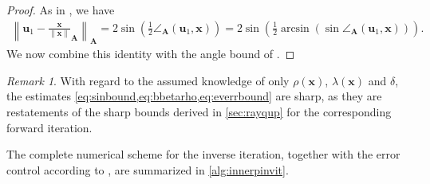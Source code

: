 \documentclass[a4paper,11pt,oneside]{amsart}
\theoremstyle{definition}
\theoremstyle{remark}
\newtheorem{remark}[theorem]{Remark}
\newcommand{\A}{\ten A}
\newcommand{\ten}[1]{\boldsymbol{#1}}
\numberwithin{equation}{section}
\numberwithin{theorem}{section}
\begin{document}
\begin{proof}
%
%
As in , we have
%
%
%
%
%
%
%
%
%
%
%
%
\begin{align*}
 \left\| \ten{u}_1 - \frac{\ten x}{\|\ten x\|}_{\A} \right\|_{\A} = 2 \sin \left(\frac{1}{2} \angle_{\A}(\ten{u}_1,\ten x) \right) 
 = 2 \sin \left(\frac{1}{2} \arcsin ( \sin\angle_{\ten A} (\ten{u}_1,\ten x)) \right).
\end{align*}
We now combine this identity with the angle bound of .
\end{proof}

\begin{remark}
With regard to the assumed knowledge of only $\rho(\ten x)$, $\lambda(\ten x)$ and $\delta$, the estimates \cref{eq:sinbound,eq:bbetarho,eq:everrbound} are sharp, as they are restatements of the sharp bounds derived in \cref{sec:rayqup} for the corresponding forward iteration.
%
\end{remark}


The complete numerical scheme for the inverse iteration, together with the error control according to , are summarized in \cref{alg:innerpinvit}. 
\end{document}
